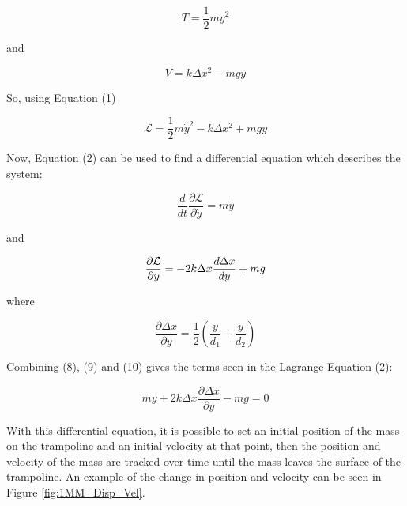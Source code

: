 \begin{equation}
T = \frac{1}{2}m\dot{y}^{2}
\end{equation}

\noindent and

\begin{equation}
V = k\Delta x^{2}-mgy
\end{equation}

\noindent So, using Equation (1)

\begin{equation}
\mathcal{L} = \frac{1}{2}m\dot{y}^{2}-k\Delta x^{2}+mgy
\end{equation}

\noindent Now, Equation (2) can be used to find a differential equation which describes the system:

\begin{equation}
\frac{d}{dt}\frac{\partial\mathcal{L}}{\partial\dot{y}} = m\ddot{y}
\end{equation}

\noindent and

\begin{equation}\\
\frac{\partial\mathcal{L}}{\partial y} = -2k\Delta x  \frac{d\Delta{x}}{dy} + mg 
\end{equation}

\noindent where

\begin{equation}
\frac{\partial\Delta x}{\partial y} = \frac{1}{2}\left(\frac{y}{d_1}+ \frac{y}{d_2}\right)
\end{equation}

\noindent Combining (8), (9) and (10) gives the terms seen in the Lagrange Equation (2):

\begin{equation}
m\ddot{y} + 2k \Delta x \frac{\partial \Delta x}{\partial y}- mg = 0
\end{equation}

\noindent With this differential equation, it is possible to set an initial position of the mass on the trampoline and an initial velocity at that point, then the position and velocity of the mass are tracked over time until the mass leaves the surface of the trampoline. An example of the change in position and velocity can be seen in Figure \ref{fig:1MM_Disp_Vel}.

